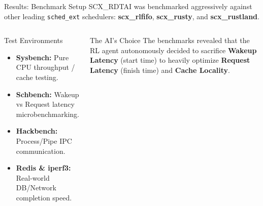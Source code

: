 \documentclass[aspectratio=169]{beamer}
\begin{document}
\begin{frame}{Results: Benchmark Setup}
  SCX\_RDTAI was benchmarked aggressively against other leading \texttt{sched\_ext} schedulers: \textbf{scx\_rlfifo}, \textbf{scx\_rusty}, and \textbf{scx\_rustland}.
  \vspace{8pt}
  \begin{columns}[T]
      \begin{exampleblock}{Test Environments}
        \begin{itemize}\small\itemsep3pt
          \item \textbf{Sysbench:} Pure CPU throughput / cache testing.
          \item \textbf{Schbench:} Wakeup vs Request latency microbenchmarking.
          \item \textbf{Hackbench:} Process/Pipe IPC communication.
          \item \textbf{Redis \& iperf3:} Real-world DB/Network completion speed.
        \end{itemize}
      \end{exampleblock}
      \begin{block}{The AI's Choice}
        \small
        The benchmarks revealed that the RL agent autonomously decided to sacrifice \textbf{Wakeup Latency} (start time) to heavily optimize \textbf{Request Latency} (finish time) and \textbf{Cache Locality}.
      \end{block}
  \end{columns}
\end{frame}
\end{document}
